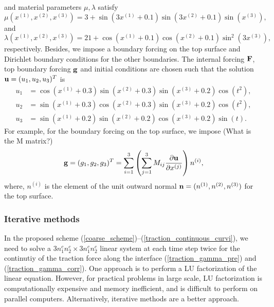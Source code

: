 \documentclass[a4paper]{article}
\begin{document}
and material parameters $\mu, \lambda$ satisfy
\begin{equation}\label{mu_function}
\mu(x^{(1)},x^{(2)},x^{(3)}) = 3 + \sin(3x^{(1)}+0.1)\sin(3x^{(2)}+0.1)\sin(x^{(3)}),
\end{equation}
and 
\begin{equation}\label{lambda_function}
\lambda(x^{(1)},x^{(2)},x^{(3)})  = 21+ \cos(x^{(1)}+0.1)\cos(x^{(2)}+0.1)\sin^2(3x^{(3)}),
\end{equation}
respectively. Besides, we impose a boundary forcing on the top surface and Dirichlet boundary conditions for the other boundaries. The internal forcing ${\bf F}$, top boundary forcing ${\bf g}$ and initial conditions are chosen such that the solution ${\bf u} = (u_1,u_2,u_3)^T$ is
\begin{align*}
u_1 &= \cos(x^{(1)}+0.3)\sin(x^{(2)}+0.3)\sin(x^{(3)}+0.2)\cos(t^2),\\
u_2 &= \sin(x^{(1)}+0.3)\cos(x^{(2)}+0.3)\sin(x^{(3)}+0.2)\cos(t^2),\\
u_3 &= \sin(x^{(1)}+0.2)\sin(x^{(2)}+0.2)\cos(x^{(3)}+0.2)\sin(t).
\end{align*}
For example, for the boundary forcing on the top surface, we impose {\color{red}(What is the M matrix?)} 
\begin{equation}\label{traction_force}
{\bf g} = (g_1,g_2,g_3)^T = \sum_{i=1}^3\left(\sum_{j = 1}^3 M_{ij}\frac{\partial{\bf u}}{\partial x^{(j)}}\right) n^{(i)},
\end{equation}
where, $n^{(i)}$ is the element of the unit outward normal ${\bf n} = (n^{(1)},n^{(2)},n^{(3)})$ for the top surface. 

\subsubsection{Iterative methods}\label{iterative_section}
In the proposed scheme (\ref{coarse_scheme})--(\ref{traction_continuous_curvi}), we need to solve a $3n_1^cn_2^c\times 3n_1^cn_2^c$ linear system at each time step twice for the continutiy of the traction force along the interface (\ref{traction_gamma_pre}) and (\ref{traction_gamma_corr}). One approach is to perform a LU factorization of the linear equation. However, for practical problems in large scale, LU factorization is computationally expensive and memory inefficient, and is difficult to perform on parallel computers. Alternatively, iterative methods are a better approach. 
\end{document}

